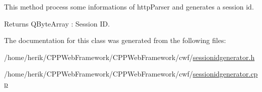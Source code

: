 This method process some informations of http\+Parser and generates a session id. 

\begin{DoxyReturn}{Returns}
Q\+Byte\+Array \+: Session I\+D. 
\end{DoxyReturn}


The documentation for this class was generated from the following files\+:\begin{DoxyCompactItemize}
\item 
/home/herik/\+C\+P\+P\+Web\+Framework/\+C\+P\+P\+Web\+Framework/cwf/\hyperlink{sessionidgenerator_8h}{sessionidgenerator.\+h}\item 
/home/herik/\+C\+P\+P\+Web\+Framework/\+C\+P\+P\+Web\+Framework/cwf/\hyperlink{sessionidgenerator_8cpp}{sessionidgenerator.\+cpp}\end{DoxyCompactItemize}
